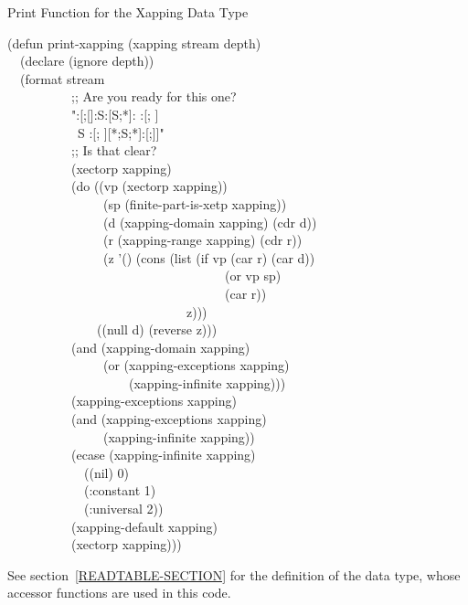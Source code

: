 \begin{table}[t]
\caption{Print Function for the Xapping Data Type}
\label{XAPPING-FORMAT-TABLE}
\begingroup
\small
\begin{lisp}
(defun print-xapping (xapping stream depth) \\
~~(declare (ignore depth)) \\
~~(format stream \\
~~~~~~~~~~;; Are you ready for this one? \\
~~~~~~~~~~"{\Xtilde}:[{\Xlbrace}{\Xtilde};[{\Xtilde}]{\Xtilde}:{\Xlbrace}{\Xtilde}S{\Xtilde}:[{\Xarrowright}{\Xtilde}S{\Xtilde};{\Xtilde}*{\Xtilde}]{\Xtilde}:{\Xcircumflex} {\Xtilde}{\Xrbrace}{\Xtilde}:[{\Xtilde}; {\Xtilde}]{\Xtilde} \\
~~~~~~~~~~~{\Xtilde}{\Xlbrace}{\Xtilde}S{\Xarrowright}{\Xtilde}{\Xcircumflex} {\Xtilde}{\Xrbrace}{\Xtilde}:[{\Xtilde}; {\Xtilde}]{\Xtilde}[{\Xtilde}*{\Xtilde};{\Xarrowright}{\Xtilde}S{\Xtilde};{\Xarrowright}{\Xtilde}*{\Xtilde}]{\Xtilde}:[{\Xrbrace}{\Xtilde};]{\Xtilde}]" \\
~~~~~~~~~~;; Is that clear? \\
~~~~~~~~~~(xectorp xapping) \\
~~~~~~~~~~(do ((vp (xectorp xapping)) \\
~~~~~~~~~~~~~~~(sp (finite-part-is-xetp xapping)) \\
~~~~~~~~~~~~~~~(d (xapping-domain xapping) (cdr d)) \\
~~~~~~~~~~~~~~~(r (xapping-range xapping) (cdr r)) \\
~~~~~~~~~~~~~~~(z '() (cons (list (if vp (car r) (car d)) \\
~~~~~~~~~~~~~~~~~~~~~~~~~~~~~~~~~~(or vp sp) \\
~~~~~~~~~~~~~~~~~~~~~~~~~~~~~~~~~~(car r)) \\
~~~~~~~~~~~~~~~~~~~~~~~~~~~~z))) \\
~~~~~~~~~~~~~~((null d) (reverse z))) \\
~~~~~~~~~~(and (xapping-domain xapping) \\
~~~~~~~~~~~~~~~(or (xapping-exceptions xapping) \\
~~~~~~~~~~~~~~~~~~~(xapping-infinite xapping))) \\
~~~~~~~~~~(xapping-exceptions xapping) \\
~~~~~~~~~~(and (xapping-exceptions xapping) \\
~~~~~~~~~~~~~~~(xapping-infinite xapping)) \\
~~~~~~~~~~(ecase (xapping-infinite xapping) \\
~~~~~~~~~~~~((nil) 0) \\
~~~~~~~~~~~~(:constant 1) \\
~~~~~~~~~~~~(:universal 2)) \\
~~~~~~~~~~(xapping-default xapping) \\
~~~~~~~~~~(xectorp xapping)))
\end{lisp}
\endgroup
See section~\ref{READTABLE-SECTION} for the  definition of the  data
type, whose accessor functions are used in this code.
\end{table}

